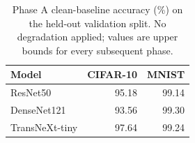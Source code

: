 \begin{table}[htbp]
\centering
\caption{Phase A clean-baseline accuracy (\%) on the held-out validation split. No degradation applied; values are upper bounds for every subsequent phase.}
\label{tab:phase_a}
\setlength{\tabcolsep}{4pt}
\renewcommand{\arraystretch}{1.1}
\begin{tabular}{lrr}
\toprule
Model & CIFAR-10 & MNIST \\
\midrule
ResNet50 & 95.18 & 99.14 \\
DenseNet121 & 93.56 & 99.30 \\
TransNeXt-tiny & 97.64 & 99.24 \\
\bottomrule
\end{tabular}
\end{table}
